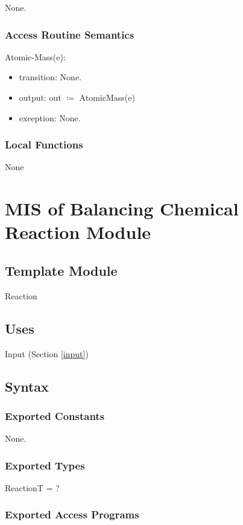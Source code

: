 \documentclass[12pt, titlepage]{article}
\begin{document}
None.

\subsubsection{Access Routine Semantics}

\noindent Atomic-Mass(e):
\begin{itemize}
\item transition: None.
\item output:  out $\coloneqq$ AtomicMass(e)
\item exception: None.
\end{itemize}

\subsubsection{Local Functions}
None

\newpage


\section{MIS of Balancing Chemical Reaction Module } \label{Reaction} 

\subsection{Template Module}

Reaction

\subsection{Uses}

 Input (Section \ref{input})

\subsection{Syntax}

\subsubsection{Exported Constants}

None.

\subsubsection{Exported Types}

ReactionT = ?

\subsubsection{Exported Access Programs}
\end{document}
